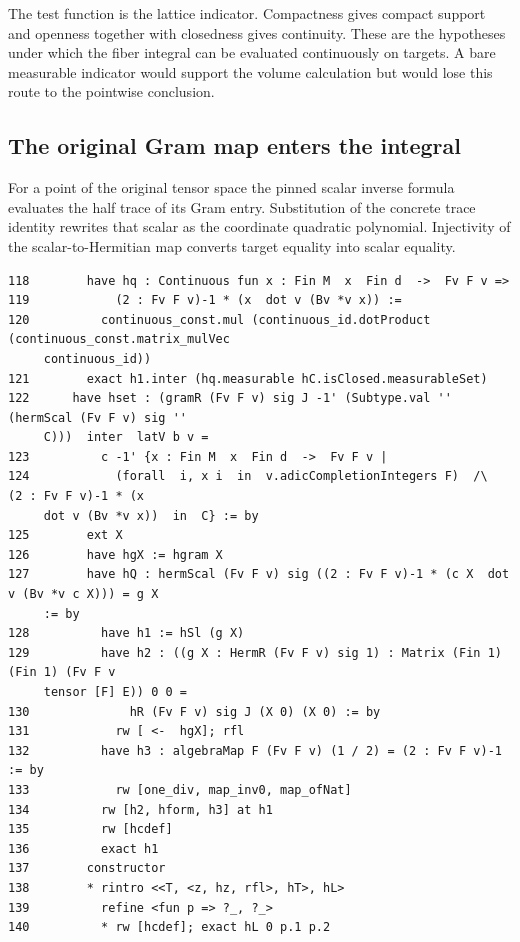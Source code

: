 \documentclass[12pt,letterpaper]{article}
\begin{document}
The test function is the lattice indicator. Compactness gives compact support and openness together with closedness gives continuity. These are the hypotheses under which the fiber integral can be evaluated continuously on targets. A bare measurable indicator would support the volume calculation but would lose this route to the pointwise conclusion.
\clearpage{}\subsection*{The original Gram map enters the integral}
For a point of the original tensor space the pinned scalar inverse formula evaluates the half trace of its Gram entry. Substitution of the concrete trace identity rewrites that scalar as the coordinate quadratic polynomial. Injectivity of the scalar-to-Hermitian map converts target equality into scalar equality.
\par
{\fontsize{8.8}{10.5}\selectfont\begin{verbatim}
118        have hq : Continuous fun x : Fin M  x  Fin d  ->  Fv F v =>
119            (2 : Fv F v)-1 * (x  dot v (Bv *v x)) :=
120          continuous_const.mul (continuous_id.dotProduct (continuous_const.matrix_mulVec
     continuous_id))
121        exact h1.inter (hq.measurable hC.isClosed.measurableSet)
122      have hset : (gramR (Fv F v) sig J -1' (Subtype.val '' (hermScal (Fv F v) sig ''
     C)))  inter  latV b v =
123          c -1' {x : Fin M  x  Fin d  ->  Fv F v |
124            (forall  i, x i  in  v.adicCompletionIntegers F)  /\  (2 : Fv F v)-1 * (x
     dot v (Bv *v x))  in  C} := by
125        ext X
126        have hgX := hgram X
127        have hQ : hermScal (Fv F v) sig ((2 : Fv F v)-1 * (c X  dot v (Bv *v c X))) = g X
     := by
128          have h1 := hSl (g X)
129          have h2 : ((g X : HermR (Fv F v) sig 1) : Matrix (Fin 1) (Fin 1) (Fv F v
     tensor [F] E)) 0 0 =
130              hR (Fv F v) sig J (X 0) (X 0) := by
131            rw [ <-  hgX]; rfl
132          have h3 : algebraMap F (Fv F v) (1 / 2) = (2 : Fv F v)-1 := by
133            rw [one_div, map_inv0, map_ofNat]
134          rw [h2, hform, h3] at h1
135          rw [hcdef]
136          exact h1
137        constructor
138        * rintro <<T, <z, hz, rfl>, hT>, hL>
139          refine <fun p => ?_, ?_>
140          * rw [hcdef]; exact hL 0 p.1 p.2
\end{verbatim}}
\end{document}
